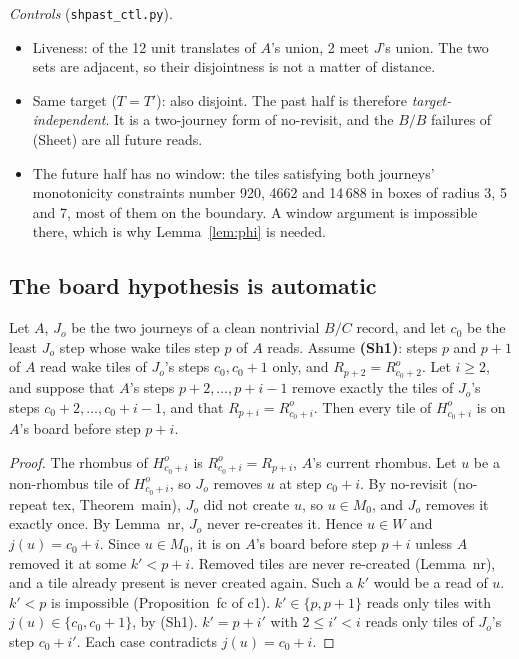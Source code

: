 \documentclass[11pt]{article}
\theoremstyle{definition}\newtheorem{definition}[theorem]{Definition}\newtheorem{remark}[theorem]{Remark}
\begin{document}
\noindent\emph{Controls} (\texttt{shpast\_ctl.py}).
\begin{itemize}
\item Liveness: of the 12 unit translates of $A$'s union, 2 meet $J$'s union. The two sets are adjacent, so their disjointness is not a matter of distance.
\item Same target ($T=T'$): also disjoint. The past half is therefore \emph{target-independent}. It is a two-journey form of no-revisit, and the $B/B$ failures of (Sheet) are all future reads.
\item The future half has no window: the tiles satisfying both journeys' monotonicity constraints number 920, 4662 and 14\,688 in boxes of radius 3, 5 and 7, most of them on the boundary. A window argument is impossible there, which is why Lemma~\ref{lem:phi} is needed.
\end{itemize}

\subsection{The board hypothesis is automatic}
\begin{lemma}\label{lem:bc}
Let $A$, $J_o$ be the two journeys of a clean nontrivial $B/C$ record, and let $c_0$ be the least $J_o$ step whose wake tiles step $p$ of $A$ reads. Assume \textbf{(Sh1)}: steps $p$ and $p+1$ of $A$ read wake tiles of $J_o$'s steps $c_0,c_0+1$ only, and $R_{p+2}=R^o_{c_0+2}$. Let $i\ge2$, and suppose that $A$'s steps $p+2,\dots,p+i-1$ remove exactly the tiles of $J_o$'s steps $c_0+2,\dots,c_0+i-1$, and that $R_{p+i}=R^o_{c_0+i}$. Then every tile of $H^o_{c_0+i}$ is on $A$'s board before step $p+i$.
\end{lemma}
\begin{proof}
The rhombus of $H^o_{c_0+i}$ is $R^o_{c_0+i}=R_{p+i}$, $A$'s current rhombus. Let $u$ be a non-rhombus tile of $H^o_{c_0+i}$, so $J_o$ removes $u$ at step $c_0+i$. By no-revisit (no-repeat tex, Theorem~main), $J_o$ did not create $u$, so $u\in M_0$, and $J_o$ removes it exactly once. By Lemma~nr, $J_o$ never re-creates it. Hence $u\in W$ and $j(u)=c_0+i$.
Since $u\in M_0$, it is on $A$'s board before step $p+i$ unless $A$ removed it at some $k'<p+i$. Removed tiles are never re-created (Lemma~nr), and a tile already present is never created again. Such a $k'$ would be a read of $u$.
$k'<p$ is impossible (Proposition~fc of c1). $k'\in\{p,p+1\}$ reads only tiles with $j(u)\in\{c_0,c_0+1\}$, by (Sh1). $k'=p+i'$ with $2\le i'<i$ reads only tiles of $J_o$'s step $c_0+i'$. Each case contradicts $j(u)=c_0+i$.
\end{proof}
\end{document}
